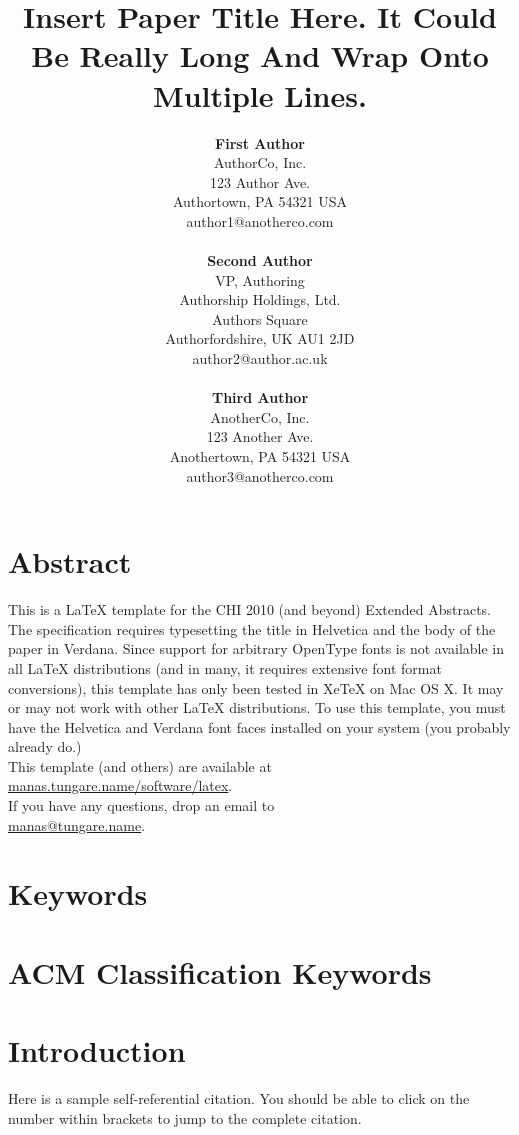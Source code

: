 \documentclass{chi-ext}
\title{Insert Paper Title Here. It Could Be Really Long And Wrap Onto Multiple Lines.}
\author{
  \textbf{First Author} \\
  AuthorCo, Inc. \\
  123 Author Ave. \\
  Authortown, PA 54321 USA \\
  author1@anotherco.com \\
  \\
  \textbf{Second Author} \\
  VP, Authoring \\
  Authorship Holdings, Ltd. \\
  Authors Square \\
  Authorfordshire, UK AU1 2JD \\
  author2@author.ac.uk \\
  \\
  \textbf{Third Author} \\
  AnotherCo, Inc. \\
  123 Another Ave. \\
  Anothertown, PA 54321 USA \\
  author3@anotherco.com \\
}
\begin{document}
\maketitle

\begin{multicols}{2}
  
\makeauthors
\makecopyright

\section{Abstract}

This is a LaTeX template for the CHI 2010 (and beyond) Extended Abstracts. The specification
requires typesetting the title in Helvetica and the body of the paper in Verdana. Since support for
arbitrary OpenType fonts is not available in all LaTeX distributions (and in many, it requires
extensive font format conversions), this template has only been tested in XeTeX on Mac OS X. It may
or may not work with other LaTeX distributions. To use this template, you must have the Helvetica
and Verdana font faces installed on your system (you probably already do.)
\\

This template (and others) are available at \\ \href{http://manas.tungare.name/software/latex}{manas.tungare.name/software/latex}.
\\

If you have any questions, drop an email to \\
\href{mailto:manas@tungare.name}{manas@tungare.name}.

\section{Keywords}
\makeatletter \@keywords \makeatother

\section{ACM Classification Keywords}
\makeatletter \@acmclassification \makeatother


\section{Introduction}

Here \cite{chi_extended_template} is a sample self-referential citation. You should be able to click
on the number within brackets to jump to the complete citation.


\end{multicols}
\end{document}
